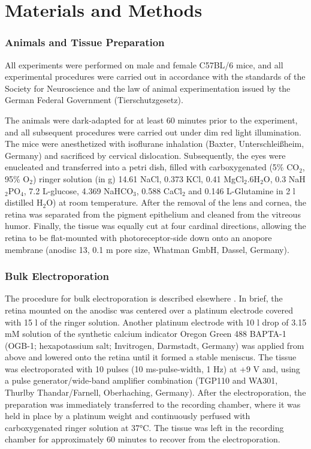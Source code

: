\chapter{Materials and Methods}
\subsection{Animals and Tissue Preparation}
All experiments were performed on male and female C57BL/6 mice, and all experimental procedures were carried out in accordance with the standards of the Society for Neuroscience and the law of animal experimentation issued by the German Federal Government (Tierschutzgesetz). 

The animals were dark-adapted for at least 60 minutes prior to the experiment, and all subsequent procedures were carried out under dim red light illumination. The mice were anesthetized with isoflurane inhalation (Baxter, Unterschleißheim, Germany) and sacrificed by cervical dislocation. Subsequently, the eyes were enucleated and transferred into a petri dish, filled with carboxygenated (5\% CO$_{2}$, 95\% O$_{2}$) ringer solution (in g) 14.61 NaCl, 0.373 KCl, 0.41 MgCl$_{2}$.6H$_{2}$O, 0.3 NaH$_{2}$PO$_{4}$, 7.2 L-glucose, 4.369 NaHCO$_{3}$, 0.588 CaCl$_{2}$ and 0.146 L-Glutamine in 2 l distilled H$_{2}$O) at room temperature. After the removal of the lens and cornea, the retina was separated from the pigment epithelium and cleaned from the vitreous humor. Finally, the tissue was equally cut at four cardinal directions, allowing the retina to be flat-mounted with photoreceptor-side down onto an anopore membrane (anodisc 13, 0.1 \textmu m pore size, Whatman GmbH, Dassel, Germany).

\subsection{Bulk Electroporation}
The procedure for bulk electroporation is described elsewhere \citep{briggman11}. In brief, the retina mounted on the anodisc was centered over a platinum electrode covered with 15 \textmu l of the ringer solution. Another platinum electrode with 10 \textmu l drop of 3.15 mM solution of the synthetic calcium indicator Oregon Green 488 BAPTA-1 (OGB-1; hexapotassium salt; Invitrogen, Darmstadt, Germany) was applied from above and lowered onto the retina until it formed a stable meniscus. The tissue was electroporated with 10 pulses (10 ms-pulse-width, 1 Hz) at +9 V and, using a pulse generator/wide-band amplifier combination (TGP110 and WA301, Thurlby Thandar/Farnell, Oberhaching, Germany). After the electroporation, the preparation was immediately transferred to the recording chamber, where it was held in place by a platinum weight and continuously perfused with carboxygenated ringer solution at 37°C. The tissue was left in the recording chamber for approximately 60 minutes to recover from the electroporation.  

